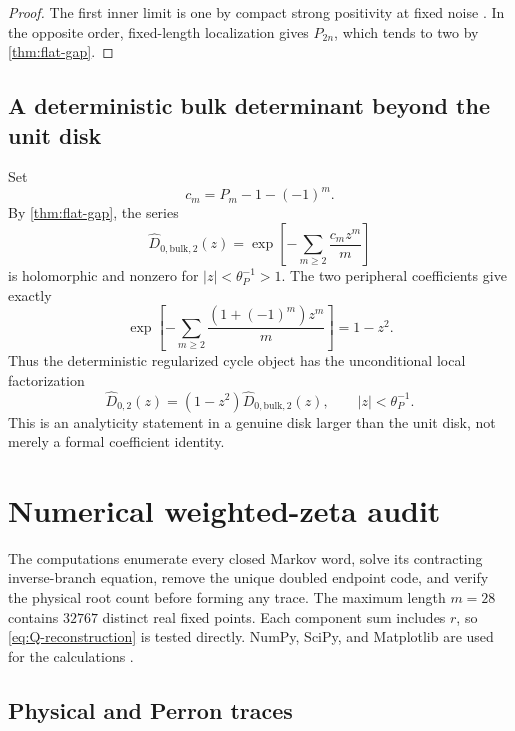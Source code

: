 \documentclass[11pt]{article}
\theoremstyle{definition}
\theoremstyle{remark}
\begin{document}
\begin{proof}
The first inner limit is one by compact strong positivity at fixed noise
\citep{WangLongCycle2026}.  In the opposite order, fixed-length localization
gives $P_{2n}$, which tends to two by \cref{thm:flat-gap}.
\end{proof}

\subsection{A deterministic bulk determinant beyond the unit disk}

Set
\begin{equation}\label{eq:centered-c}
 c_m=P_m-1-(-1)^m.
\end{equation}
By \cref{thm:flat-gap}, the series
\begin{equation}\label{eq:bulk-det}
 \widehat D_{0,\mathrm{bulk},2}(z)
 =\exp\left[-\sum_{m\ge2}\frac{c_mz^m}{m}\right]
\end{equation}
is holomorphic and nonzero for
$|z|<\theta_P^{-1}>1$.  The two peripheral coefficients give exactly
\begin{equation}\label{eq:parity-factor}
 \exp\left[-\sum_{m\ge2}
 \frac{(1+(-1)^m)z^m}{m}\right]
 =1-z^2.
\end{equation}
Thus the deterministic regularized cycle object has the unconditional local
factorization
\begin{equation}\label{eq:det-factorization}
 \widehat D_{0,2}(z)
 =(1-z^2)\widehat D_{0,\mathrm{bulk},2}(z),
 \qquad |z|<\theta_P^{-1}.
\end{equation}
This is an analyticity statement in a genuine disk larger than the unit disk,
not merely a formal coefficient identity.

\section{Numerical weighted-zeta audit}
\label{sec:numerics}

The computations enumerate every closed Markov word, solve its contracting
inverse-branch equation, remove the unique doubled endpoint code, and verify
the physical root count before forming any trace.  The maximum length
$m=28$ contains $32767$ distinct real fixed points.  Each component sum
includes $r$, so \eqref{eq:Q-reconstruction} is tested directly.  NumPy,
SciPy, and Matplotlib are used for the calculations
\citep{HarrisEtAl2020,VirtanenEtAl2020,Hunter2007}.

\subsection{Physical and Perron traces}
\end{document}

